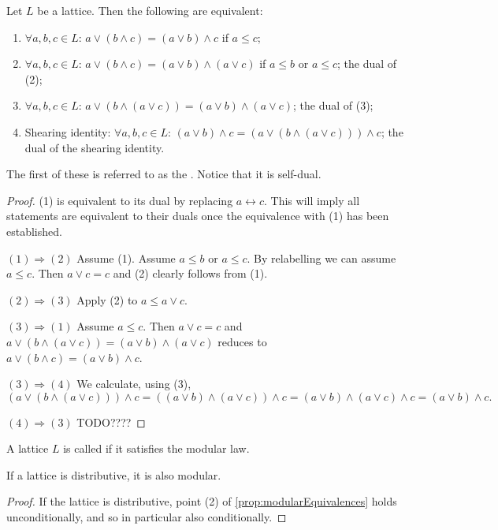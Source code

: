 \begin{proposition} \label{prop:modularEquivalences}
Let $L$ be a lattice. Then the following are equivalent:
\begin{enumerate}
\item $\forall a,b,c\in L$: $a \vee (b\wedge c) = (a\vee b) \wedge c$ if $a\leq c$;
\item $\forall a,b,c\in L$: $a \vee (b\wedge c) = (a\vee b) \wedge (a\vee c)$ if $a\leq b$ or $a\leq c$; the dual of (2);
\item $\forall a,b,c\in L$: $a\vee (b\wedge (a\vee c)) = (a\vee b)\wedge (a\vee c)$; the dual of (3);
\item \textup{Shearing identity}: $\forall a,b,c\in L$: $(a\vee b) \wedge c = (a\vee (b\wedge (a\vee c)))\wedge c$; the dual of the shearing identity.
\end{enumerate}
\end{proposition}
The first of these is referred to as the . Notice that it is self-dual.
\begin{proof}
(1) is equivalent to its dual by replacing $a\leftrightarrow c$. This will imply all statements are equivalent to their duals once the equivalence with (1) has been established. 

$\boxed{(1)\Rightarrow (2)}$ Assume (1). Assume $a\leq b$ or $a\leq c$. By relabelling we can assume $a\leq c$.  Then $a\vee c = c$ and (2) clearly follows from (1).


$\boxed{(2)\Rightarrow (3)}$ Apply (2) to $a\leq a\vee c$.

$\boxed{(3)\Rightarrow (1)}$ Assume $a\leq c$. Then $a\vee c = c$ and $a\vee (b\wedge (a\vee c)) = (a\vee b)\wedge (a\vee c)$ reduces to $a \vee (b\wedge c) = (a\vee b) \wedge c$.

$\boxed{(3)\Rightarrow (4)}$ We calculate, using (3),
\[ (a\vee (b\wedge (a\vee c)))\wedge c = ((a\vee b)\wedge (a\vee c))\wedge c = (a\vee b) \wedge (a\vee c) \wedge c = (a\vee b) \wedge c. \]

$\boxed{(4)\Rightarrow (3)}$ TODO????
\end{proof}

\begin{definition}
A lattice $L$ is called  if it satisfies the modular law.
\end{definition}

\begin{lemma}
If a lattice is distributive, it is also modular.
\end{lemma}
\begin{proof}
If the lattice is distributive, point (2) of \ref{prop:modularEquivalences} holds unconditionally, and so in particular also conditionally.
\end{proof}

